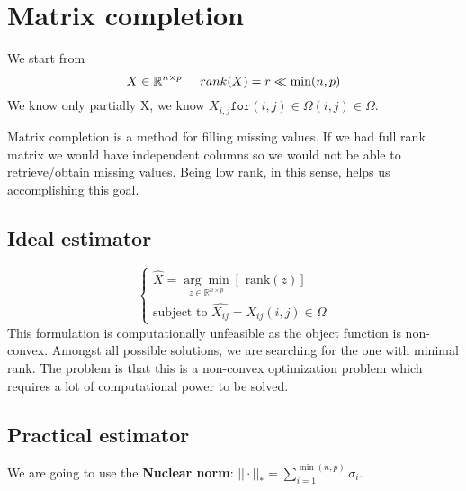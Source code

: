 \section{Matrix completion}
We start from 
\[
    X \in \mathbb{R}^{n \times p}  \hspace{0.5cm} rank(X) = r \ll \min(n,p) 
\]
We know only partially X, we know $X_{i,j} \texttt{for} (i,j)\in\Omega(i,j) \in \Omega.$ 

Matrix completion is a method for filling missing values. If we had full rank matrix we would have independent columns so we would not be able to retrieve/obtain missing values. Being low rank, in this sense, helps us accomplishing this goal.  

\subsection*{Ideal estimator}
\[
    \begin{cases}
        \hat{X} = \underset{z \in \mathbb{R}^{n \times p}}{\arg \min} \left[\text{ rank}(z)\right]\\
        \text{subject to } \hat{X_{ij}} = X_{ij} (i,j) \in \Omega
    \end{cases}    
\]
This formulation is computationally unfeasible as  the object function is non-convex. Amongst all possible solutions, we are searching for the one with minimal rank.
The problem is that this is a non-convex optimization problem which requires a lot of computational power to be solved.

\subsection*{Practical estimator}
We are going to use the \textbf{Nuclear norm}: $||\cdot||_*  = \sum\limits_{i=1}^{\min(n,p)}\sigma_i$.


